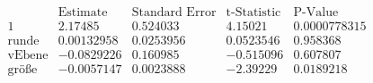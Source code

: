 \[\begin{array}{l|llll}
 \text{} & \text{Estimate} & \text{Standard Error} & \text{t-Statistic} & \text{P-Value} \\
\hline
 1 & 2.17485 & 0.524033 & 4.15021 & 0.0000778315 \\
 \text{runde} & 0.00132958 & 0.0253956 & 0.0523546 & 0.958368 \\
 \text{vEbene} & -0.0829226 & 0.160985 & -0.515096 & 0.607807 \\
 \text{gr{\" o}{\ss}e} & -0.0057147 & 0.0023888 & -2.39229 & 0.0189218 \\
\end{array}\]

